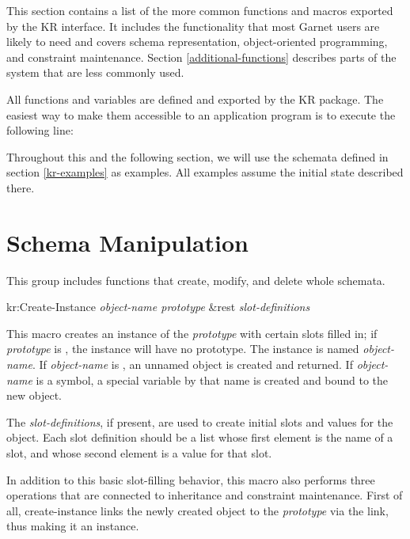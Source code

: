 This section contains a list of the more common functions and macros
exported by the KR interface.  It includes the functionality that most
Garnet users are likely to need and covers schema representation,
object-oriented programming, and constraint maintenance.  Section
\ref{additional-functions} describes parts of the system that are less
commonly used.

All functions and variables are defined and exported by the KR package.
The easiest way to make them accessible to an application program is to
execute the following line:

Throughout this and the following section, we will use the schemata defined
in section \ref{kr-examples} as examples.  All examples assume the initial
state described there.



\section{Schema Manipulation}
\value{s-top}

This group includes functions that create,
modify, and delete whole schemata.


\value{f-top}
\begin{example}
kr:Create-Instance {\it object-name prototype} \&rest {\it slot-definitions}\value{macro}
\end{example}

This macro creates an instance of the {\it prototype} with certain slots
filled in;  if {\it prototype} is \value{nil}, the instance will have no
prototype.  The instance is named {\it object-name}.  If {\it object-name} is
\value{nil}, an unnamed object is created and returned.  If {\it object-name}
is a symbol, a special variable by that name is created and bound to the
new object.

The {\it slot-definitions}, if present, are used to create initial slots and
values for the object.  Each slot definition should be a list whose first
element is the name of a slot, and whose second element is a value for that
slot.

In addition to this basic slot-filling behavior, this macro also performs
three operations that are connected to inheritance and constraint
maintenance.  First of all, create-instance links the newly created
object to the {\it prototype} via the  link, thus making it
an instance.

